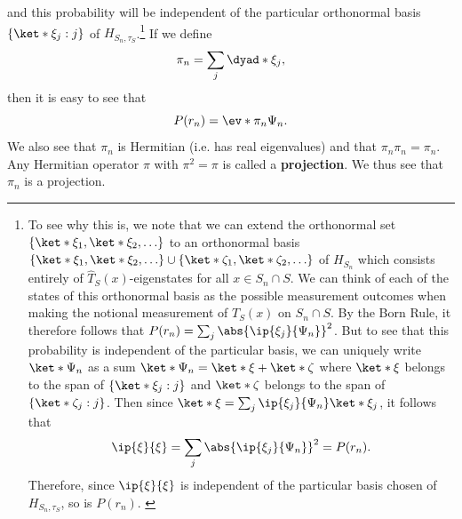 \documentclass[12pt]{report}
\providecommand{\DIFadd}[1]{{\protect\color{blue}\uwave{#1}}} %
\providecommand{\DIFdel}[1]{{\protect\color{red}\sout{#1}}}                      %
\providecommand{\DIFaddbegin}{} %
\providecommand{\DIFaddend}{} %
\providecommand{\DIFdelbegin}{} %
\providecommand{\DIFdelend}{} %
\begin{document}
 and this probability will be independent of the particular orthonormal basis  \DIFdelbegin \DIFdel{$\{\ket*{\xi_j}:j\}$ }\DIFdelend \DIFaddbegin \DIFadd{$\{\ket*{\xi_j}:j\in\mathbb{N}\}$ }\DIFaddend of $H_{S_n,\tau_S}$.\footnote{To see why this is, we note that we can extend the orthonormal set $\{\ket*{\xi_1},\ket*{\xi_2},\ldots\}$ to an orthonormal basis  $\{\ket*{\xi_1},\ket*{\xi_2},\ldots\}\cup\{\ket*{\zeta_1},\ket*{\zeta_2},\ldots\}$ of $H_{S_n}$ which consists entirely of $\hat{T}_S(x)$-eigenstates for all $x\in S_n\cap S$. We can think of each of the states of this orthonormal basis as the possible measurement outcomes when making the notional measurement of $T_S(x)$ on $S_n\cap S$. By the Born Rule, it therefore follows that $P(r_n)=\sum_j \abs{ \ip{\xi_j}{\Psi_n}}^2$. But to see that this probability is independent of the particular basis, we can uniquely write $\ket*{\Psi_n}$ as a sum $\ket*{\Psi_n}=\ket*{\xi}+\ket*{\zeta}$ where $\ket*{\xi}$ belongs to the span of \DIFdelbegin \DIFdel{$\{\ket*{\xi_j}:j\}$ }\DIFdelend \DIFaddbegin \DIFadd{$\{\ket*{\xi_j}:j\in\mathbb{N}\}$ }\DIFaddend and $\ket*{\zeta}$ belongs to the span of \DIFdelbegin \DIFdel{$\{\ket*{\zeta_j}:j\}$}\DIFdelend \DIFaddbegin \DIFadd{$\{\ket*{\zeta_j}:j\in\mathbb{N}\}$}\DIFaddend .  Then since $\ket*{\xi}=\sum_j\ip{\xi_j}{\Psi_n}\ket*{\xi_j}$, it follows that $$\ip{\xi}{\xi}=\sum_j\abs{ \ip{\xi_j}{\Psi_n}}^2=P(r_n).$$ Therefore, since  $\ip{\xi}{\xi}$ is independent of the particular basis chosen of $H_{S_n,\tau_S}$, so is $P(r_n)$.  \label{priproof} } If we define 
\begin{equation}\label{tauprojection}
\pi_n=\sum_j\DIFdelbegin %
\DIFdelend \DIFaddbegin \dyad*{\xi_j}\DIFaddend ,
\end{equation}%
%
then it is easy to see that
\begin{equation}\label{Prn}
	P(r_n)=\ev*{\pi_n}{\Psi_n}.
\end{equation}
We also see that $\pi_n$ is Hermitian (i.e. has real eigenvalues) and that $\pi_n \pi_n = \pi_n$. Any Hermitian operator $\pi$ with $\pi^2=\pi$ is called a \textbf{projection}. We thus see that $\pi_n$ is a projection.
\end{document}
